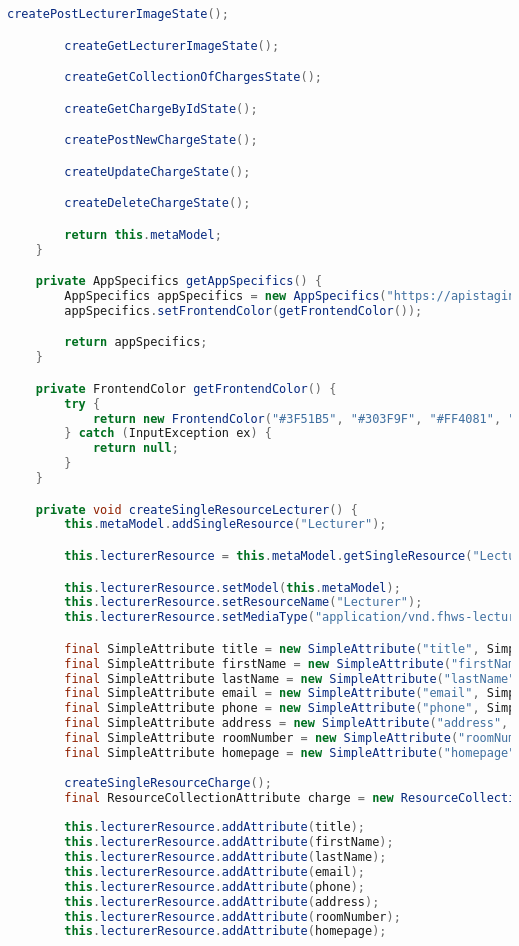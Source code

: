 \begin{lstlisting}[label=lst:enfield_model,
language=java,
firstnumber=1,
caption=Beschreibung des \textit{Enfield-Modell} der Referenzimplementierung. ]
		createPostLecturerImageState();

		createGetLecturerImageState();

		createGetCollectionOfChargesState();

		createGetChargeByIdState();

		createPostNewChargeState();

		createUpdateChargeState();

		createDeleteChargeState();

		return this.metaModel;
	}

	private AppSpecifics getAppSpecifics() {
		AppSpecifics appSpecifics = new AppSpecifics("https://apistaging.fiw.fhws.de/mig/api/");
		appSpecifics.setFrontendColor(getFrontendColor());

		return appSpecifics;
	}

	private FrontendColor getFrontendColor() {
		try {
			return new FrontendColor("#3F51B5", "#303F9F", "#FF4081", "#fff");
		} catch (InputException ex) {
			return null;
		}
	}

	private void createSingleResourceLecturer() {
		this.metaModel.addSingleResource("Lecturer");

		this.lecturerResource = this.metaModel.getSingleResource("Lecturer");

		this.lecturerResource.setModel(this.metaModel);
		this.lecturerResource.setResourceName("Lecturer");
		this.lecturerResource.setMediaType("application/vnd.fhws-lecturer.default+json");

		final SimpleAttribute title = new SimpleAttribute("title", SimpleDatatype.STRING);
		final SimpleAttribute firstName = new SimpleAttribute("firstName", SimpleDatatype.STRING);
		final SimpleAttribute lastName = new SimpleAttribute("lastName", SimpleDatatype.STRING);
		final SimpleAttribute email = new SimpleAttribute("email", SimpleDatatype.STRING);
		final SimpleAttribute phone = new SimpleAttribute("phone", SimpleDatatype.STRING);
		final SimpleAttribute address = new SimpleAttribute("address", SimpleDatatype.STRING);
		final SimpleAttribute roomNumber = new SimpleAttribute("roomNumber", SimpleDatatype.STRING);
		final SimpleAttribute homepage = new SimpleAttribute("homepage", SimpleDatatype.LINK);
		
		createSingleResourceCharge();
		final ResourceCollectionAttribute charge = new ResourceCollectionAttribute("chargeUrl", this.chargeResource);
	
		this.lecturerResource.addAttribute(title);
		this.lecturerResource.addAttribute(firstName);
		this.lecturerResource.addAttribute(lastName);
		this.lecturerResource.addAttribute(email);
		this.lecturerResource.addAttribute(phone);
		this.lecturerResource.addAttribute(address);
		this.lecturerResource.addAttribute(roomNumber);
		this.lecturerResource.addAttribute(homepage);
		

\end{lstlisting}
